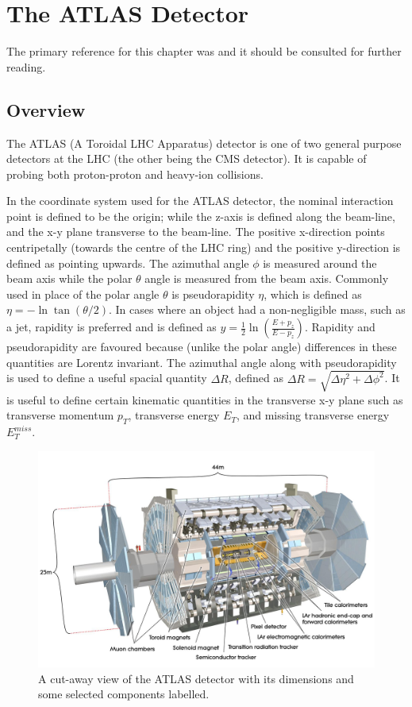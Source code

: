 \chapter{The ATLAS Detector}
The primary reference for this chapter was \cite{ATLAS} and it should be consulted for further reading.
\section{Overview}
\label{atlas_overview}
The ATLAS (A Toroidal LHC Apparatus) detector \cite{ATLAS} is one of two general purpose detectors at the LHC (the other being the CMS detector). It is capable of probing both proton-proton and heavy-ion collisions.

In the coordinate system used for the ATLAS detector, the nominal interaction point is defined to be the origin; while the z-axis is defined along the beam-line, and the x-y plane transverse to the beam-line. The positive x-direction points centripetally (towards the centre of the LHC ring) and the positive y-direction is defined as pointing upwards. The azimuthal angle $\phi$ is measured around the beam axis while the polar $\theta$ angle is measured from the beam axis. Commonly used in place of the polar angle $\theta$ is pseudorapidity $\eta$, which is defined as $\eta = -\ln \tan(\theta /2)$. In cases where an object had a non-negligible mass, such as a jet, rapidity is preferred and is defined as $y = \frac{1}{2} \ln \left( \frac{E+p_{z}}{E-p_{z}} \right) $. Rapidity and pseudorapidity are favoured because (unlike the polar angle) differences in these quantities are Lorentz invariant. The azimuthal angle along with pseudorapidity is used to define a useful spacial quantity $\Delta R$, defined as $\Delta R = \sqrt{\Delta \eta ^{2} + \Delta \phi ^{2}}$. It is useful to define certain kinematic quantities in the transverse x-y plane such as transverse momentum $p_{T}$, transverse energy $E_{T}$, and missing transverse energy $E_{T}^{miss}$.

\begin{figure}
\centering
\includegraphics[scale=0.25]{images/image_AtlasDetector.png}
\caption{A cut-away view of the ATLAS detector with its dimensions and some selected components labelled. \cite{ATLAS}}
\label{AtlasDetector}
\end{figure}

